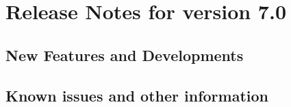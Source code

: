 \makeatletter
\section{Release Notes for version 7.0}
\makeatother

\subsection{New Features and Developments}


\subsection{Known issues and other information}

